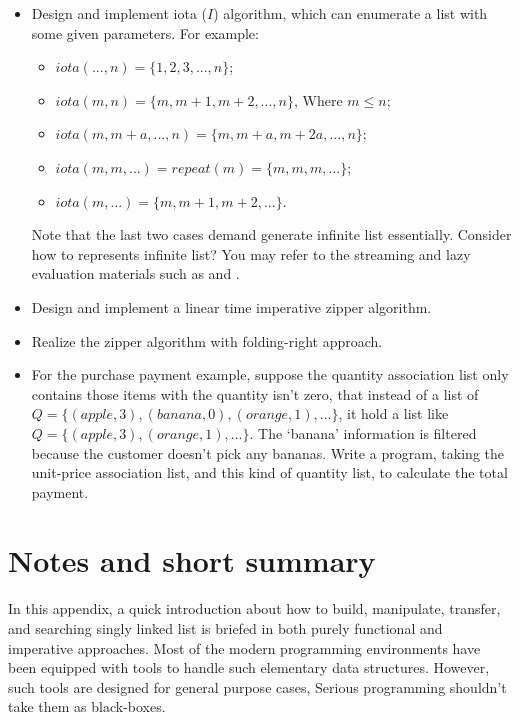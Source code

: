 \documentclass[b5paper]{article}
\begin{document}
\begin{Exercise}
\begin{itemize}
\item Design and implement iota ($I$) algorithm, which can enumerate a list with some given parameters. For example:
  \begin{itemize}
  \item $iota(..., n) = \{1, 2, 3, ..., n\}$;
  \item $iota(m, n) = \{m, m+1, m+2, ..., n\}$, Where $m \leq n$;
  \item $iota(m, m+a, ..., n) = \{m, m+a, m+2a, ..., n \}$;
  \item $iota(m, m, ...) = repeat(m) = \{m, m, m, ...\}$;
  \item $iota(m, ...) = \{m, m+1, m+2, ... \}$.
  \end{itemize}
  Note that the last two cases demand generate infinite list essentially. Consider how to represents infinite list?
  You may refer to the streaming and lazy evaluation materials such as \cite{SICP} and \cite{learn-haskell}.
\item Design and implement a linear time imperative zipper algorithm.
\item Realize the zipper algorithm with folding-right approach.
\item For the purchase payment example, suppose the quantity association list only contains those items with
the quantity isn't zero, that instead of a list of $Q = \{(apple, 3), (banana, 0), (orange, 1), ...\}$, it
hold a list like $Q = \{(apple, 3), (orange, 1), ...\}$. The `banana' information is filtered because the customer
doesn't pick any bananas. Write a program, taking the unit-price association list, and this kind of quantity
list, to calculate the total payment.
\end{itemize}
\end{Exercise}

\section{Notes and short summary}
In this appendix, a quick introduction about how to build, manipulate, transfer, and searching singly
linked list is briefed in both purely functional and imperative approaches. Most of the modern programming
environments have been equipped with tools to handle such elementary data structures. However, such tools
are designed for general purpose cases, Serious programming shouldn't take them as black-boxes.
\end{document}
